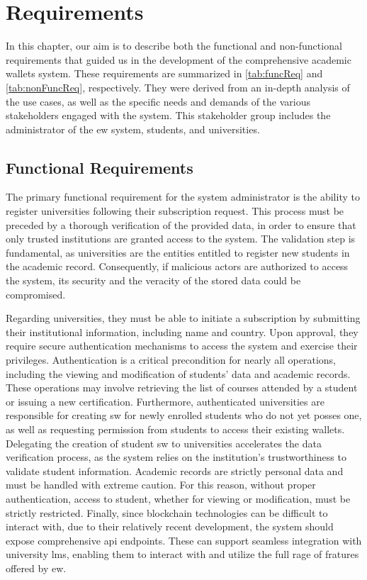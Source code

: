 \chapter{Requirements}
\label{chap:requirements}
In this chapter, our aim is to describe both the functional and non-functional requirements that guided us in the development of the comprehensive academic wallets system. These requirements are summarized in \cref{tab:funcReq} and \cref{tab:nonFuncReq}, respectively. They were derived from an in-depth analysis of the use cases, as well as the specific needs and demands of the various stakeholders engaged with the system. This stakeholder group includes the administrator of the \acrfull{ew} system, students, and universities.

\section{Functional Requirements}
The primary functional requirement for the system administrator is the ability to register universities following their subscription request. This process must be preceded by a thorough verification of the provided data, in order to ensure that only trusted institutions are granted access to the system. The validation step is fundamental, as universities are the entities entitled to register new students in the academic record. Consequently, if malicious actors are authorized to access the system, its security and the veracity of the stored data could be compromised.

Regarding universities, they must be able to initiate a subscription by submitting their institutional information, including name and country. Upon approval, they require secure authentication mechanisms to access the system and exercise their privileges. Authentication is a critical precondition for nearly all operations, including the viewing and modification of students' data and academic records. These operations may involve retrieving the list of courses attended by a student or issuing a new certification. Furthermore, authenticated universities are responsible for creating \acrfull{sw} for newly enrolled students who do not yet posses one, as well as requesting permission from students to access their existing wallets. Delegating the creation of student \acrshort{sw} to universities accelerates the data verification process, as the system relies on the institution's trustworthiness to validate student information. Academic records are strictly personal data and must be handled with extreme caution. For this reason, without proper authentication, access to student, whether for viewing or modification, must be strictly restricted. 
Finally, since blockchain technologies can be difficult to interact with, due to their relatively recent development, the system should expose comprehensive \acrfull{api} endpoints. These can support seamless integration with university \acrfull{lms}, enabling them to interact with and utilize the full rage of fratures offered by \acrlong{ew}.

